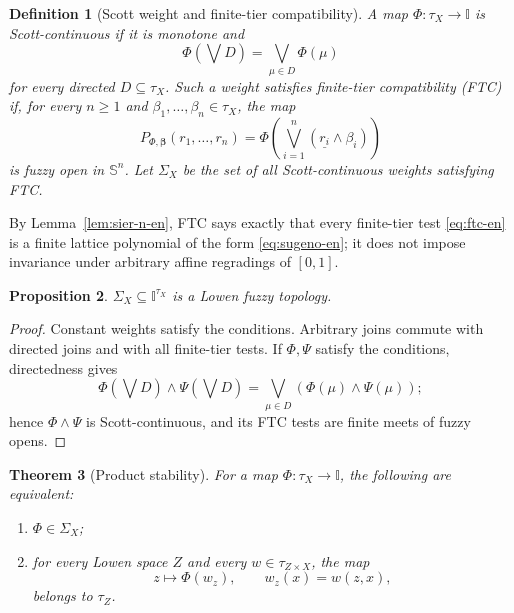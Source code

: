 \documentclass[10pt,a4paper]{amsart}
\numberwithin{equation}{section}
\newtheorem{theorem}{Theorem}[section]
\newtheorem{proposition}[theorem]{Proposition}
\newtheorem{definition}[theorem]{Definition}
\newcommand{\I}{\mathbb I}
\newcommand{\Sier}{\mathbb S}
\newcommand{\const}[1]{\underline{#1}}
\begin{document}
\begin{definition}[Scott weight and finite-tier compatibility]
A map \(\Phi:\tau_X\to\I\) is Scott-continuous if it is monotone and
\[
 \Phi(\bigvee D)=\bigvee_{\mu\in D}\Phi(\mu)
\]
for every directed \(D\subseteq\tau_X\).  Such a weight satisfies
\emph{finite-tier compatibility} (FTC) if, for every \(n\geq1\) and
\(\beta_1,\ldots,\beta_n\in\tau_X\), the map
\begin{equation}\label{eq:ftc-en}
 P_{\Phi,\boldsymbol\beta}(r_1,\ldots,r_n)
 =\Phi\left(\bigvee_{i=1}^n
      (\const{r_i}\wedge\beta_i)\right)
\end{equation}
is fuzzy open in \(\Sier^n\).  Let \(\Sigma_X\) be the set of all
Scott-continuous weights satisfying FTC.
\end{definition}

By Lemma~\ref{lem:sier-n-en}, FTC says exactly that every finite-tier
test \eqref{eq:ftc-en} is a finite lattice polynomial of the form
\eqref{eq:sugeno-en}; it does not impose invariance under arbitrary
affine regradings of \([0,1]\).

\begin{proposition}\label{prop:sigma-en}
\(\Sigma_X\subseteq\I^{\tau_X}\) is a Lowen fuzzy topology.
\end{proposition}

\begin{proof}
Constant weights satisfy the conditions.  Arbitrary joins commute with
directed joins and with all finite-tier tests.  If \(\Phi,\Psi\) satisfy
the conditions, directedness gives
\[
 \Phi\left(\bigvee D\right)\wedge \Psi\left(\bigvee D\right)
 =\bigvee_{\mu\in D}(\Phi(\mu)\wedge\Psi(\mu));
\]
hence \(\Phi\wedge\Psi\) is Scott-continuous, and its FTC tests are
finite meets of fuzzy opens.
\end{proof}

\begin{theorem}[Product stability]\label{thm:prod-stable-en}
For a map \(\Phi:\tau_X\to\I\), the following are equivalent:
\begin{enumerate}[label=(\roman*)]
 \item \(\Phi\in\Sigma_X\);
 \item for every Lowen space \(Z\) and every
 \(w\in\tau_{Z\times X}\), the map
 \[
  z\longmapsto\Phi(w_z),\qquad w_z(x)=w(z,x),
 \]
 belongs to \(\tau_Z\).
\end{enumerate}
\end{theorem}
\end{document}
